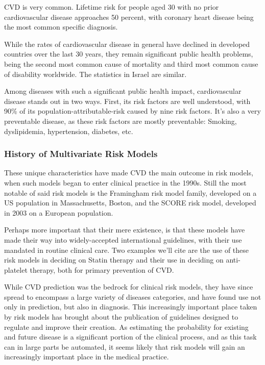 \documentclass[a4paper,12pt]{article}
\begin{document}
			CVD is very common. Lifetime risk for people aged 30 with no prior cardiovascular disease approaches 50 percent\cite{Rapsomaniki2014}, with coronary heart disease being the most common specific diagnosis\cite{Benjamin2017}.
	
			While the rates of cardiovascular disease in general have declined in developed countries over the last 30 years\cite{Koton2014,Vangen-Loenne2017}, they remain significant public health problems, being the second most common cause of mortality and third most common cause of disability worldwide\cite{Lozano2012}. The statistics in Israel are similar\cite{ICDC2017}.
			
			Among diseases with such a significant public health impact, cardiovascular disease stands out in two ways. First, its risk factors are well understood, with 90\% of its population-attributable-risk caused by nine risk factors. It's also a very preventable disease, as these risk factors are mostly preventable\cite{Yusuf2004,ODonnell2016}: Smoking, dyslipidemia, hypertension, diabetes, etc.
			
			\subsubsection{History of Multivariate Risk Models}
		
			These unique characteristics have made CVD the main outcome in risk models, when such models began to enter clinical practice in the 1990s\cite{Wilson1998,NationalCholesterolEducationProgramNCEPExpertPanelonDetection2002,Conroy2003,Hippisley-Cox2007,DAgostino2008,Hippisley-Cox2008,Goff2014}. Still the most notable of said risk models is the Framingham risk model family, developed on a US population in Massachusetts, Boston\cite{Wilson1998}, and the SCORE risk model, developed in 2003 on a European population\cite{Conroy2003}.
			
			Perhaps more important that their mere existence, is that these models have made their way into widely-accepted international guidelines, with their use mandated in routine clinical care. Two examples we'll cite are the use of these risk models in deciding on Statin therapy\cite{Goff2014} and their use in deciding on anti-platelet therapy\cite{Bibbins-Domingo2016}, both for primary prevention of CVD.
			
			While CVD prediction was the bedrock for clinical risk models, they have since spread to encompass a large variety of diseases categories\cite{Kanis2008,Kansagara2011}, and have found use not only in prediction, but also in diagnosis\cite{Usher-Smith2016}. This increasingly important place taken by risk models has brought about the publication of guidelines designed to regulate and improve their creation\cite{Collins2015}. As estimating the probability for existing and future disease is a significant portion of the clinical process\cite{Moons2009}, and as this task can in large parts be automated, it seems likely that risk models will gain an increasingly important place in the medical practice.
			
\end{document}
